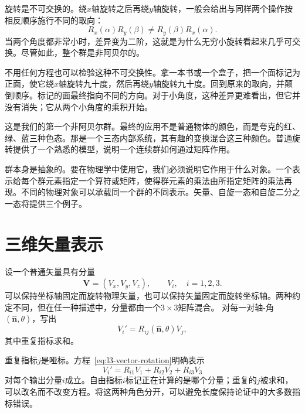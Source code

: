 旋转是不可交换的。绕\(x\)轴旋转之后再绕\(y\)轴旋转，一般会给出与同样两个操作按相反顺序施行不同的取向：
\begin{equation}
R_x(\alpha)R_y(\beta)\ne R_y(\beta)R_x(\alpha).
\end{equation}
当两个角度都非常小时，差异变为二阶，这就是为什么无穷小旋转看起来几乎可交换。尽管如此，整个群是非阿贝尔的。

不用任何方程也可以检验这种不可交换性。拿一本书或一个盒子，把一个面标记为正面，使它绕\(x\)轴旋转九十度，然后再绕\(y\)轴旋转九十度。回到原来的取向，并颠倒顺序。标记的面最终指向不同的方向。对于小角度，这种差异更难看出，但它并没有消失；它从两个小角度的乘积开始。

\begin{classroomqa}
\end{classroomqa}

这是我们的第一个非阿贝尔群。最终的应用不是普通物体的颜色，而是夸克的红、绿、蓝三种色态。那是一个三态内部系统，其有趣的变换混合这三种颜色。普通旋转提供了一个熟悉的模型，说明一个连续群如何通过矩阵作用。

群本身是抽象的。要在物理学中使用它，我们必须说明它作用于什么对象。一个{表示}给每个群元素指定一个算符或矩阵，使得群元素的乘法由所指定矩阵的乘法再现。不同的物理对象可以承载同一个群的不同表示。矢量、自旋一态和自旋二分之一态将提供三个例子。

\section{三维矢量表示}

设一个普通矢量具有分量
\begin{equation}
\boldsymbol V=(V_x,V_y,V_z),\qquad V_i,\quad i=1,2,3.
\end{equation}
可以保持坐标轴固定而旋转物理矢量，也可以保持矢量固定而旋转坐标轴。两种约定不同，但在任一种描述中，分量都由一个\(3\times3\)矩阵混合。
对每一对轴-角\((\hat{\boldsymbol n},\theta)\)，写出
\begin{equation}
V_i'=R_{ij}(\hat{\boldsymbol n},\theta)V_j,
\label{eq:l3-vector-rotation}
\end{equation}
其中重复指标求和。

重复指标\(j\)是哑标。方程~\eqref{eq:l3-vector-rotation}明确表示
\begin{equation}
V_i'=R_{i1}V_1+R_{i2}V_2+R_{i3}V_3
\end{equation}
对每个输出分量\(i\)成立。自由指标\(i\)标记正在计算的是哪个分量；重复的\(j\)被求和，可以改名而不改变方程。将这两种角色分开，可以避免长度保持论证中的大多数指标错误。

